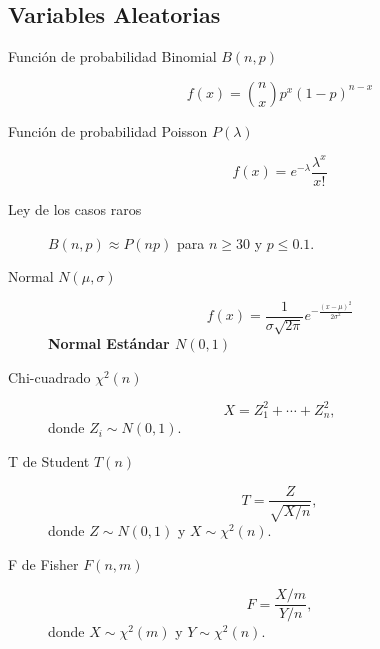 \begin{multicols*}{2}
	\subsection*{Variables Aleatorias}

	\begin{tcolorbox}[hbox, title=Discretas]
		\begin{minipage}{0.4\textwidth}
			\begin{description}
				\item [Función de probabilidad Binomial $B(n,p)$]
				      \[f(x)=\binom{n}{x}p^x (1-p)^{n-x}\]
				\item [Función de probabilidad Poisson $P(\lambda)$]
				      \[f(x)=e^{-\lambda}\frac{\lambda^x}{x!}\]
				\item [Ley de los casos raros] $B(n,p)\approx P(np)$ para $n\geq 30$ y $p\leq 0.1$.
			\end{description}
		\end{minipage}
	\end{tcolorbox}

  \begin{tcolorbox}[hbox, title=Continuas]
		\begin{minipage}{0.4\textwidth}
			\begin{description}
				\item[Normal $N(\mu,\sigma)$]
              \[f(x)= \frac{1}{\sigma\sqrt{2\pi}}e^{-\frac{(x-\mu)^2}{2\sigma^2}}\]
              \textbf{Normal Estándar $N(0,1)$}
				\item[Chi-cuadrado $\chi^2(n)$]
              \[X = Z_1^2+\cdots +Z_n^2,\]
              donde $Z_i\sim N(0,1)$.
        \item[T de Student $T(n)$] 
        \[T = \frac{Z}{\sqrt{X/n}},\]
        donde $Z\sim N(0,1)$ y $X\sim \chi^2(n)$.
        \item[F de Fisher $F(n,m)$]
        \[F = \frac{X/m}{Y/n},\]
        donde $X\sim \chi^2(m)$ y $Y\sim \chi^2(n)$.
			\end{description}
		\end{minipage}
	\end{tcolorbox}

\end{multicols*}